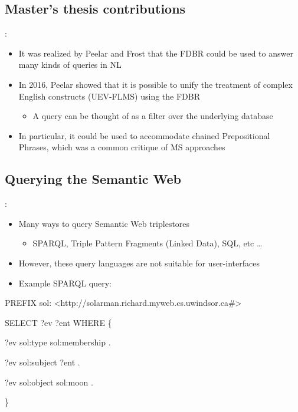\documentclass[logoontitle,tabu,supertabular,aspectratio=43]{preney-uwindsor-beamer}
\begin{document}
    \subsection{Master's thesis contributions}
    \begin{frame}{\insertsection: \insertsubsection}
        \begin{itemize}
            \item It was realized by Peelar and Frost that the FDBR could be used to answer many kinds of queries in NL
            \item In 2016, Peelar showed that it is possible to unify the treatment of complex English constructs (UEV-FLMS) using the FDBR \cite{peelar2016accommodating}
            \begin{itemize}
                \item A query can be thought of as a filter over the underlying database
            \end{itemize}
            \item In particular, it could be used to accommodate chained Prepositional Phrases, which was a common critique of MS approaches
        \end{itemize}
    \end{frame}

    \subsection{Querying the Semantic Web}
    \begin{frame}{\insertsection: \insertsubsection}
        \begin{itemize}
            \item Many ways to query Semantic Web triplestores
            \begin{itemize}
                \item SPARQL, Triple Pattern Fragments (Linked Data), SQL, etc \ldots
            \end{itemize}
            \item However, these query languages are not suitable for user-interfaces
            \item Example SPARQL query:
        \end{itemize}
        \begin{block}

            \ttfamily

            PREFIX sol: <http://solarman.richard.myweb.cs.uwindsor.ca\#>

            SELECT ?ev ?ent WHERE \{

            \hspace{5em}    ?ev sol:type sol:membership .

            \hspace{5em}    ?ev sol:subject ?ent .

            \hspace{5em}    ?ev sol:object sol:moon .

            \}
        \end{block}
    \end{frame}
\end{document}
